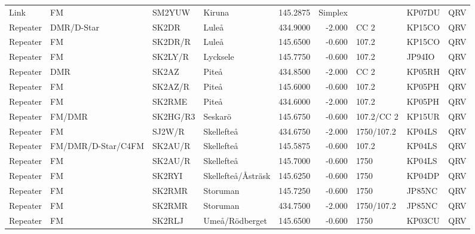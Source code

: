 \begin{landscape}
\begin{longtable}{llllrrlll}
	Link     & FM                 & SM2YUW    & Kiruna               &     145.2875 &    Simplex &            & KP07DU      & QRV      \\
	Repeater & DMR/D-Star         & SK2DR     & Luleå                &     434.9000 &     -2.000 & CC 2       & KP15CO      & QRV      \\
	Repeater & FM                 & SK2DR/R   & Luleå                &     145.6500 &     -0.600 & 107.2      & KP15CO      & QRV      \\
	Repeater & FM                 & SK2LY/R   & Lycksele             &     145.7750 &     -0.600 & 107.2      & JP94IO      & QRV      \\
	Repeater & DMR                & SK2AZ     & Piteå                &     434.8500 &     -2.000 & CC 2       & KP05RH      & QRV      \\
	Repeater & FM                 & SK2AZ/R   & Piteå                &     145.6000 &     -0.600 & 107.2      & KP05PH      & QRV      \\
	Repeater & FM                 & SK2RME    & Piteå                &     434.6000 &     -2.000 & 107.2      & KP05PH      & QRV      \\
	Repeater & FM/DMR             & SK2HG/R3  & Seskarö              &     145.6750 &     -0.600 & 107.2/CC 2 & KP15UR      & QRV      \\
	Repeater & FM                 & SJ2W/R    & Skellefteå           &     434.6750 &     -2.000 & 1750/107.2 & KP04LS      & QRV      \\
	Repeater & FM/DMR/D-Star/C4FM & SK2AU/R   & Skellefteå           &     145.5875 &     -0.600 & 107.2      & KP04LS      & QRV      \\
	Repeater & FM                 & SK2AU/R   & Skellefteå           &     145.7000 &     -0.600 & 1750       & KP04LS      & QRV      \\
	Repeater & FM                 & SK2RYI    & Skellefteå/Åsträsk   &     145.6250 &     -0.600 & 1750       & KP04DP      & QRV      \\
	Repeater & FM                 & SK2RMR    & Storuman             &     145.7250 &     -0.600 & 1750       & JP85NC      & QRV      \\
	Repeater & FM                 & SK2RMR    & Storuman             &     434.7500 &     -2.000 & 1750/107.2 & JP85NC      & QRV      \\
	Repeater & FM                 & SK2RLJ    & Umeå/Rödberget       &     145.6500 &     -0.600 & 1750       & KP03CU      & QRV      \\

\end{longtable}
\end{landscape}
